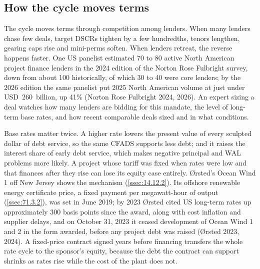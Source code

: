 \begin{exhibit}[H]
\end{exhibit}

\subsection{How the cycle moves terms}\label{ssec:36.10.2}

The cycle moves terms through competition among lenders. When many lenders chase few deals, target DSCRs tighten by a few hundredths, tenors lengthen, gearing caps rise and mini-perms soften. When lenders retreat, the reverse happens faster. One US panelist estimated 70 to 80 active North American project finance lenders in the 2024 edition of the Norton Rose Fulbright survey, down from about 100 historically, of which 30 to 40 were core lenders; by the 2026 edition the same panelist put 2025 North American volume at just under USD~260~billion, up 41\% (Norton Rose Fulbright 2024, 2026). An expert sizing a deal watches how many lenders are bidding for this mandate, the level of long-term base rates, and how recent comparable deals sized and in what conditions.

Base rates matter twice. A higher rate lowers the present value of every sculpted dollar of debt service, so the same CFADS supports less debt; and it raises the interest share of early debt service, which makes negative principal and WAL problems more likely. A project whose tariff was fixed when rates were low and that finances after they rise can lose its equity case entirely. Ørsted's Ocean Wind 1 off New Jersey shows the mechanism (\cref{ssec:14.12.2}). Its offshore renewable energy certificate price, a fixed payment per megawatt-hour of output (\cref{ssec:71.3.2}), was set in June 2019; by 2023 Ørsted cited US long-term rates up approximately 300 basis points since the award, along with cost inflation and supplier delays, and on October 31, 2023 it ceased development of Ocean Wind 1 and 2 in the form awarded, before any project debt was raised (Ørsted 2023, 2024). A fixed-price contract signed years before financing transfers the whole rate cycle to the sponsor's equity, because the debt the contract can support shrinks as rates rise while the cost of the plant does not.

